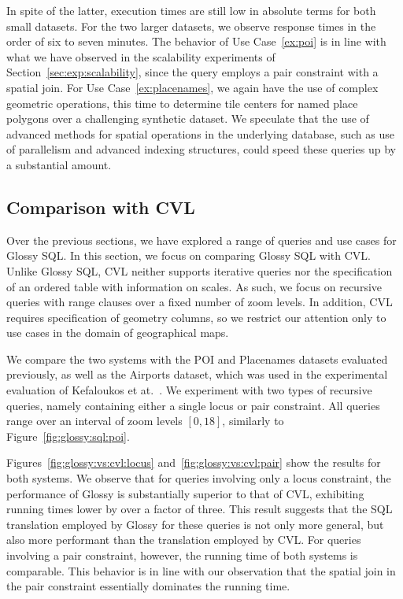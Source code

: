 \documentclass[11pt, oneside]{report}
\begin{document}
In spite of the latter, execution times are still low in absolute terms for both small datasets. For the two larger datasets, we observe response times in the order of six to seven minutes. The behavior of Use Case~\ref{ex:poi} is in line with what we have observed in the scalability experiments of Section~\ref{sec:exp:scalability}, since the query employs a pair constraint with a spatial join. For Use Case~\ref{ex:placenames}, we again have the use of complex geometric operations, this time to determine tile centers for named place polygons over a challenging synthetic dataset. We speculate that the use of advanced methods for spatial operations in the underlying database, such as use of parallelism and advanced indexing structures, could speed these queries up by a substantial amount. 

\subsection{Comparison with CVL}

Over the previous sections, we have explored a range of queries and use cases for Glossy SQL. In this section, we focus on comparing Glossy SQL with CVL. Unlike Glossy SQL, CVL neither supports iterative queries nor the specification of an ordered table with information on scales. As such, we focus on recursive queries with range clauses over a fixed number of zoom levels. In addition, CVL requires specification of geometry columns, so we restrict our attention only to use cases in the domain of geographical maps. 

We compare the two systems with the POI and Placenames datasets evaluated previously, as well as the Airports dataset, which was used in the experimental evaluation of Kefaloukos et at.~\cite{KefaloukosSZ14:CVL}. We experiment with two types of recursive queries, namely containing either a single locus or pair constraint. All queries range over an interval of zoom levels $[0,18]$, similarly to Figure~\ref{fig:glossy:sql:poi}. 

Figures~\ref{fig:glossy:vs:cvl:locus} and~\ref{fig:glossy:vs:cvl:pair} show the results for both systems. We observe that for queries involving only a locus constraint, the performance of Glossy is substantially superior to that of CVL, exhibiting running times lower by over a factor of three. This result suggests that the SQL translation employed by Glossy for these queries is not only more general, but also more performant than the translation employed by CVL. For queries involving a pair constraint, however, the running time of both systems is comparable. This behavior is in line with our observation that the spatial join in the pair constraint essentially dominates the running time.        
\end{document}
